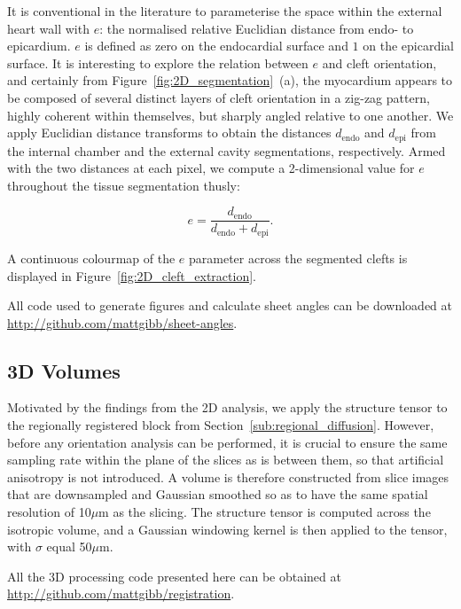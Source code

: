     It is conventional in the literature to parameterise the space within the external heart wall with $e$: the normalised relative Euclidian distance from endo- to epicardium. $e$ is defined as zero on the endocardial surface and $1$ on the epicardial surface. It is interesting to explore the relation between $e$ and cleft orientation, and certainly from Figure~\ref{fig:2D_segmentation}~(a), the myocardium appears to be composed of several distinct layers of cleft orientation in a zig-zag pattern, highly coherent within themselves, but sharply angled relative to one another. We apply Euclidian distance transforms to obtain the distances $d_{\text{endo}}$ and $d_{\text{epi}}$ from the internal chamber and the external cavity segmentations, respectively. Armed with the two distances at each pixel, we compute a 2-dimensional value for $e$ throughout the tissue segmentation thusly:
  
    \begin{equation}
      e = \frac{d_{\text{endo}}}{d_{\text{endo}} + d_{\text{epi}} }.
    \end{equation}
  
    A continuous colourmap of the $e$ parameter across the segmented clefts is displayed in Figure~\ref{fig:2D_cleft_extraction}.
    
    All code used to generate figures and calculate sheet angles can be downloaded at \url{http://github.com/mattgibb/sheet-angles}.
  
  \subsection{3D Volumes} %
  \label{sub:3d_volumes}
    Motivated by the findings from the 2D analysis, we apply the structure tensor to the regionally registered block from Section~\ref{sub:regional_diffusion}. However, before any orientation analysis can be performed, it is crucial to ensure the same sampling rate within the plane of the slices as is between them, so that artificial anisotropy is not introduced. A volume is therefore constructed from slice images that are downsampled and Gaussian smoothed so as to have the same spatial resolution of 10$\mu$m as the slicing. The structure tensor is computed across the isotropic volume, and a Gaussian windowing kernel is then applied to the tensor, with $\sigma$ equal 50$\mu$m.
  
    All the 3D processing code presented here can be obtained at \url{http://github.com/mattgibb/registration}.

